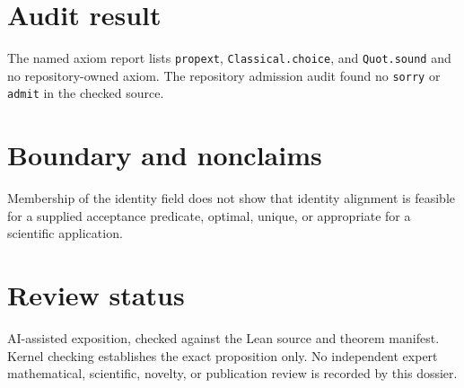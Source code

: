 \documentclass[11pt]{article}
\begin{document}
\section{Audit result}
The named axiom report lists \texttt{propext}, \texttt{Classical.choice}, and
\texttt{Quot.sound} and no repository-owned axiom. The repository admission audit found no
\texttt{sorry} or \texttt{admit} in the checked source.

\section{Boundary and nonclaims}
Membership of the identity field does not show that identity alignment is feasible for a supplied
acceptance predicate, optimal, unique, or appropriate for a scientific application.

\section{Review status}
AI-assisted exposition, checked against the Lean source and theorem manifest. Kernel checking
establishes the exact proposition only. No independent expert mathematical, scientific,
novelty, or publication review is recorded by this dossier.
\end{document}
